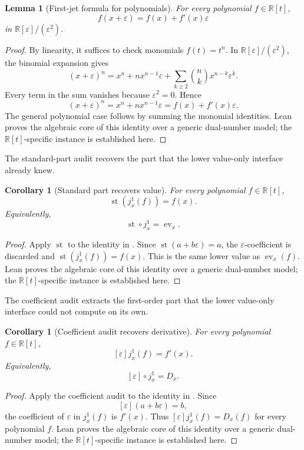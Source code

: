 \documentclass[11pt]{article}
\newcommand{\R}{\mathbb R}
\newcommand{\Dual}{\R[\varepsilon]/(\varepsilon^2)}
\newcommand{\ev}{\operatorname{ev}}
\newcommand{\st}{\operatorname{st}}
\newtheorem{lemma}[theorem]{Lemma}
\newtheorem{corollary}[theorem]{Corollary}
\theoremstyle{definition}
\begin{document}
\begin{lemma}[First-jet formula for polynomials]
\label{lem:jet-first-jet-formula}
For every polynomial \(f\in\mathbb R[t]\),
\[
f(x+\varepsilon)=f(x)+f'(x)\varepsilon
\]
in \(\Dual\).
\end{lemma}

\begin{proof}
By linearity, it suffices to check monomials \(f(t)=t^n\).  In \(\Dual\),
the binomial expansion gives
\[
(x+\varepsilon)^n
=x^n+n x^{n-1}\varepsilon
+\sum_{k\geq 2}\binom{n}{k}x^{n-k}\varepsilon^k.
\]
Every term in the sum vanishes because \(\varepsilon^2=0\).  Hence
\[
(x+\varepsilon)^n=x^n+n x^{n-1}\varepsilon
=f(x)+f'(x)\varepsilon.
\]
The general polynomial case follows by summing the monomial identities.  Lean
proves the algebraic core of this identity over a generic dual-number model;
the \(\R[t]\)-specific instance is established here.
\end{proof}

The standard-part audit recovers the part that the lower value-only interface
already knew.

\begin{corollary}[Standard part recovers value]
\label{cor:jet-standard-part-value}
For every polynomial \(f\in\mathbb R[t]\),
\[
\st(j_x^1(f))=f(x).
\]
Equivalently,
\[
\st\circ j_x^1=\ev_x.
\]
\end{corollary}

\begin{proof}
Apply \(\st\) to the identity in .  Since
\(\st(a+b\varepsilon)=a\), the \(\varepsilon\)-coefficient is discarded and
\(\st(j_x^1(f))=f(x)\).  This is the same lower value as \(\ev_x(f)\).  Lean
proves the algebraic core of this identity over a generic dual-number model;
the \(\R[t]\)-specific instance is established here.
\end{proof}

The coefficient audit extracts the first-order part that the lower value-only
interface could not compute on its own.

\begin{corollary}[Coefficient audit recovers derivative]
\label{cor:jet-coefficient-recovers-derivative}
For every polynomial \(f\in\mathbb R[t]\),
\[
[\varepsilon]j_x^1(f)=f'(x).
\]
Equivalently,
\[
[\varepsilon]\circ j_x^1=D_x.
\]
\end{corollary}

\begin{proof}
Apply the coefficient audit to the identity in
.  Since
\[
[\varepsilon](a+b\varepsilon)=b,
\]
the coefficient of \(\varepsilon\) in \(j_x^1(f)\) is \(f'(x)\).  Thus
\([\varepsilon]j_x^1(f)=D_x(f)\) for every polynomial \(f\).  Lean proves the
algebraic core of this identity over a generic dual-number model; the
\(\R[t]\)-specific instance is established here.
\end{proof}
\end{document}
